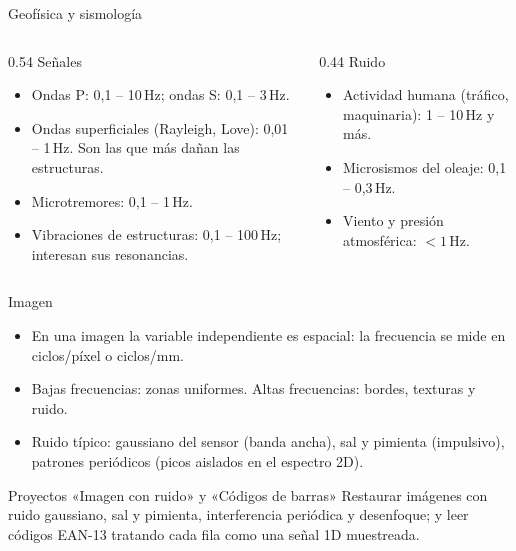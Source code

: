 \documentclass[aspectratio=169,11pt]{beamer}
\begin{document}
\begin{frame}{Geofísica y sismología}
  \begin{columns}[T]
    \begin{column}{0.54\textwidth}
      \alert{Señales}
      \begin{itemize}\small
        \item Ondas P: 0,1 – 10\,Hz; ondas S: 0,1 – 3\,Hz.
        \item Ondas superficiales (Rayleigh, Love): 0,01 – 1\,Hz. Son las que más dañan las estructuras.
        \item Microtremores: 0,1 – 1\,Hz.
        \item Vibraciones de estructuras: 0,1 – 100\,Hz; interesan sus resonancias.
      \end{itemize}
    \end{column}
    \begin{column}{0.44\textwidth}
      \alert{Ruido}
      \begin{itemize}\small
        \item Actividad humana (tráfico, maquinaria): 1 – 10\,Hz y más.
        \item Microsismos del oleaje: 0,1 – 0,3\,Hz.
        \item Viento y presión atmosférica: $<1$\,Hz.
      \end{itemize}
    \end{column}
  \end{columns}
\end{frame}

\begin{frame}{Imagen}
  \begin{itemize}
    \item En una imagen la variable independiente es espacial: la frecuencia se mide en ciclos/píxel o ciclos/mm.
    \item Bajas frecuencias: zonas uniformes. Altas frecuencias: bordes, texturas y ruido.
    \item Ruido típico: gaussiano del sensor (banda ancha), sal y pimienta (impulsivo), patrones periódicos (picos aislados en el espectro 2D).
  \end{itemize}
  \begin{block}{Proyectos «Imagen con ruido» y «Códigos de barras»}
    \small Restaurar imágenes con ruido gaussiano, sal y pimienta, interferencia periódica y desenfoque; y leer códigos EAN-13 tratando cada fila como una señal 1D muestreada.
  \end{block}
\end{frame}
\end{document}
